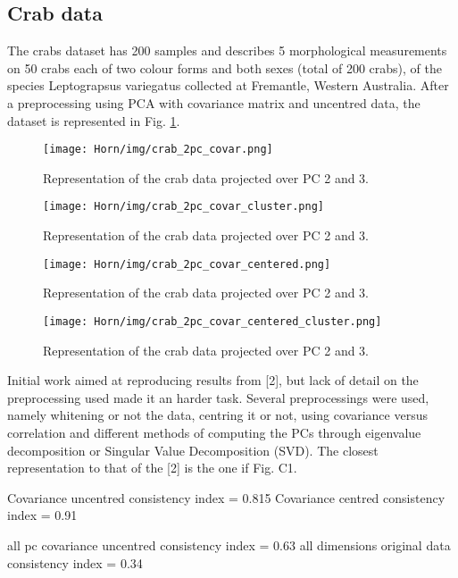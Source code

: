 \subsection{Crab data}

The crabs dataset has 200 samples and describes 5 morphological measurements on 50 crabs each of two colour forms and both sexes (total of 200 crabs), of the species Leptograpsus variegatus collected at Fremantle, Western Australia. After a preprocessing using PCA with covariance matrix and uncentred data, the dataset is represented in Fig. \ref{fig:crab_2pc_covar}.%

\begin{figure}[hbtp]
\centering
\texttt{[image: Horn/img/crab\_2pc\_covar.png]}
\caption{Representation of the crab data projected over PC 2 and 3.}
\label{fig:crab_2pc_covar}
\end{figure}

\begin{figure}[hbtp]
\centering
\texttt{[image: Horn/img/crab\_2pc\_covar\_cluster.png]}
\caption{Representation of the crab data projected over PC 2 and 3.}
\label{fig:crab_2pc_covar_cluster}
\end{figure}

\begin{figure}[hbtp]
\centering
\texttt{[image: Horn/img/crab\_2pc\_covar\_centered.png]}
\caption{Representation of the crab data projected over PC 2 and 3.}
\label{fig:crab_2pc_covar_centered}
\end{figure}

\begin{figure}[hbtp]
\centering
\texttt{[image: Horn/img/crab\_2pc\_covar\_centered\_cluster.png]}
\caption{Representation of the crab data projected over PC 2 and 3.}
\label{fig:crab_2pc_covar_centered_cluster}
\end{figure}


Initial work aimed at reproducing results from [2], but lack of detail on the preprocessing used made it an harder task. Several preprocessings were used, namely whitening or not the data, centring it or not, using covariance versus correlation and different methods of computing the PCs through eigenvalue decomposition or Singular Value Decomposition (SVD). The closest representation to that of the [2] is the one if Fig. C1.



Covariance uncentred consistency index = 0.815
Covariance centred consistency index = 0.91

all pc covariance uncentred consistency index = 0.63
all dimensions original data consistency index = 0.34